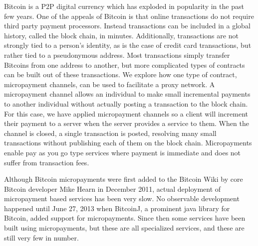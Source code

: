 Bitcoin\cite{nakamoto2008bitcoin} is a P2P digital currency which has exploded in popularity in the past few years. One of the appeals of Bitcoin is that online transactions do not require third party payment processors. Instead transactions can be included in a global history, called the block chain, in minutes. Additionally, transactions are not strongly tied to a person's identity, as is the case of credit card transactions, but rather tied to a pseudonymous address. Most transactions simply transfer Bitcoins from one address to another, but more complicated types of contracts can be built out of these transactions. We explore how one type of contract, micropayment channels, can be used to facilitate a proxy network. A micropayment channel allows an individual to make small incremental payments to another individual without actually posting a transaction to the block chain. For this case, we have applied micropayment channels so a client will increment their payment to a server when the server provides a service to them. When the channel is closed, a single transaction is posted, resolving many small transactions without publishing each of them on the block chain. Micropayments enable pay as you go type services where payment is immediate and does not suffer from transaction fees.

Although Bitcoin micropayments were first added to the Bitcoin Wiki by core Bitcoin developer Mike Hearn in December 2011,  actual deployment of micropayment based services has been very slow. No observable development happened until June 27, 2013 when BitcoinJ, a prominent java library for Bitcoin, added support for micropayments. Since then some services have been built using micropayments, but these are all specialized services, and these are still very few in number.
